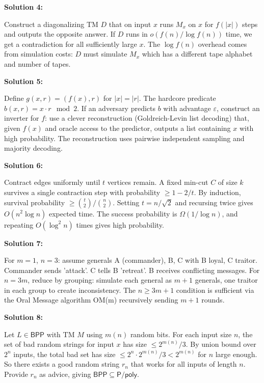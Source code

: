 \documentclass[12pt,a4paper]{exam}
\begin{document}
\vspace{0.5cm}

\textbf{Solution 4:}

Construct a diagonalizing TM $D$ that on input $x$ runs $M_x$ on $x$ for $f(|x|)$ steps and outputs the opposite answer. If $D$ runs in $o(f(n)/\log f(n))$ time, we get a contradiction for all sufficiently large $x$. The $\log f(n)$ overhead comes from simulation costs: $D$ must simulate $M_x$ which has a different tape alphabet and number of tapes.

\vspace{0.5cm}

\textbf{Solution 5:}

Define $g(x,r) = (f(x), r)$ for $|x| = |r|$. The hardcore predicate $b(x,r) = x \cdot r \mod 2$. If an adversary predicts $b$ with advantage $\varepsilon$, construct an inverter for $f$: use a clever reconstruction (Goldreich-Levin list decoding) that, given $f(x)$ and oracle access to the predictor, outputs a list containing $x$ with high probability. The reconstruction uses pairwise independent sampling and majority decoding.

\vspace{0.5cm}

\textbf{Solution 6:}

Contract edges uniformly until $t$ vertices remain. A fixed min-cut $C$ of size $k$ survives a single contraction step with probability $\geq 1 - 2/t$. By induction, survival probability $\geq \binom{t}{2}/\binom{n}{2}$. Setting $t = n/\sqrt{2}$ and recursing twice gives $O(n^2 \log n)$ expected time. The success probability is $\Omega(1/\log n)$, and repeating $O(\log^2 n)$ times gives high probability.

\vspace{0.5cm}

\textbf{Solution 7:}

For $m=1$, $n=3$: assume generals A (commander), B, C with B loyal, C traitor. Commander sends 'attack'. C tells B 'retreat'. B receives conflicting messages. For $n=3m$, reduce by grouping: simulate each general as $m+1$ generals, one traitor in each group to create inconsistency. The $n \geq 3m+1$ condition is sufficient via the Oral Message algorithm OM(m) recursively sending $m+1$ rounds.

\vspace{0.5cm}

\textbf{Solution 8:}

Let $L \in \mathsf{BPP}$ with TM $M$ using $m(n)$ random bits. For each input size $n$, the set of bad random strings for input $x$ has size $\leq 2^{m(n)}/3$. By union bound over $2^n$ inputs, the total bad set has size $\leq 2^n \cdot 2^{m(n)}/3 < 2^{m(n)}$ for $n$ large enough. So there exists a good random string $r_n$ that works for all inputs of length $n$. Provide $r_n$ as advice, giving $\mathsf{BPP} \subseteq \mathsf{P}/\mathsf{poly}$.
\end{document}
